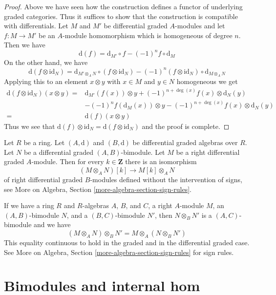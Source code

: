 \begin{proof}
Above we have seen how the construction defines a functor of underlying
graded categories. Thus it suffices to show that the construction is
compatible with differentials. Let $M$ and $M'$ be differential
graded $A$-modules and let $f : M \to M'$ be an $A$-module homomorphism
which is homogeneous of degree $n$. Then we have
$$
\text{d}(f) = \text{d}_{M'} \circ f - (-1)^n f \circ \text{d}_M
$$
On the other hand, we have
$$
\text{d}(f \otimes \text{id}_N) =
\text{d}_{M' \otimes_A N} \circ
(f \otimes \text{id}_N)
- (-1)^n
(f \otimes \text{id}_N) \circ \text{d}_{M \otimes_A N}
$$
Applying this to an element $x \otimes y$ with $x \in M$ and
$y \in N$ homogeneous we get
\begin{align*}
\text{d}(f \otimes \text{id}_N)(x \otimes y)
= &
\text{d}_{M'}(f(x)) \otimes y + (-1)^{n + \deg(x)}f(x) \otimes \text{d}_N(y) \\
& - (-1)^n f(\text{d}_M(x)) \otimes y
- (-1)^{n + \deg(x)}f(x) \otimes \text{d}_N(y) \\
= &
\text{d}(f) (x \otimes y)
\end{align*}
Thus we see that $\text{d}(f) \otimes \text{id}_N =
\text{d}(f \otimes \text{id}_N)$ and the proof is complete.
\end{proof}

\begin{remark}
\label{remark-shift-tensor-no-sign}
Let $R$ be a ring. Let $(A, \text{d})$ and $(B, \text{d})$
be differential graded algebras over $R$. Let $N$ be a
differential graded $(A, B)$-bimodule. Let $M$ be a right differential
graded $A$-module. Then for every $k \in \mathbf{Z}$ there
is an isomorphism
$$
(M \otimes_A N)[k] \longrightarrow
M[k] \otimes_A N
$$
of right differential graded $B$-modules defined without the intervention
of signs, see More on Algebra, Section \ref{more-algebra-section-sign-rules}.
\end{remark}

\noindent
If we have a ring $R$ and $R$-algebras $A$, $B$, and $C$,
a right $A$-module $M$, an $(A, B)$-bimodule $N$, and a
$(B, C)$-bimodule $N'$, then
$N \otimes_B N'$ is a $(A, C)$-bimodule and we have
$$
(M \otimes_A N) \otimes_B N' = M \otimes_A (N \otimes_B N')
$$
This equality continuous to hold in the graded and in the differential
graded case. See More on Algebra, Section \ref{more-algebra-section-sign-rules}
for sign rules.






\section{Bimodules and internal hom}
\label{section-bimodules-hom}

